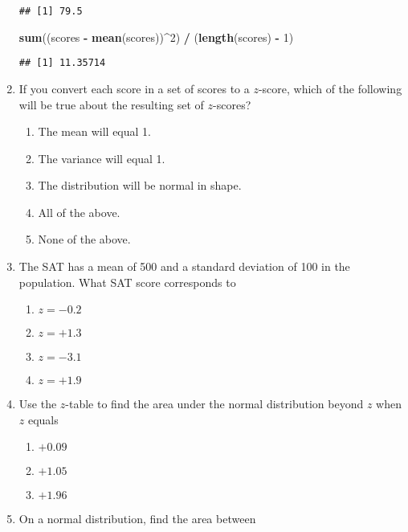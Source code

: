 \documentclass[]{article}
\newenvironment{Shaded}{\begin{snugshade}}{\end{snugshade}}
\newcommand{\KeywordTok}[1]{\textcolor[rgb]{0.13,0.29,0.53}{\textbf{#1}}}
\newcommand{\DecValTok}[1]{\textcolor[rgb]{0.00,0.00,0.81}{#1}}
\newcommand{\StringTok}[1]{\textcolor[rgb]{0.31,0.60,0.02}{#1}}
\newcommand{\OperatorTok}[1]{\textcolor[rgb]{0.81,0.36,0.00}{\textbf{#1}}}
\newcommand{\NormalTok}[1]{#1}
\providecommand{\tightlist}{%
  \setlength{\itemsep}{0pt}\setlength{\parskip}{0pt}}
\begin{document}
\begin{enumerate}
\begin{verbatim}
## [1] 79.5
\end{verbatim}

\begin{Shaded}
\begin{Highlighting}[]
\KeywordTok{sum}\NormalTok{((scores }\OperatorTok{-}\StringTok{ }\KeywordTok{mean}\NormalTok{(scores))}\OperatorTok{^}\DecValTok{2}\NormalTok{) }\OperatorTok{/}\StringTok{ }\NormalTok{(}\KeywordTok{length}\NormalTok{(scores) }\OperatorTok{-}\StringTok{ }\DecValTok{1}\NormalTok{)}
\end{Highlighting}
\end{Shaded}

\begin{verbatim}
## [1] 11.35714
\end{verbatim}
\item
  If you convert each score in a set of scores to a \(z\)-score, which
  of the following will be true about the resulting set of \(z\)-scores?

  \begin{enumerate}
  \def\labelenumii{\alph{enumii}.}
  \tightlist
  \item
    The mean will equal 1.
  \item
    The variance will equal 1.
  \item
    The distribution will be normal in shape.
  \item
    All of the above.
  \item
    None of the above.
  \end{enumerate}
\item
  The SAT has a mean of 500 and a standard deviation of 100 in the
  population. What SAT score corresponds to

  \begin{enumerate}
  \def\labelenumii{\alph{enumii}.}
  \tightlist
  \item
    \(z= -0.2\)
  \item
    \(z= +1.3\)
  \item
    \(z= -3.1\)
  \item
    \(z= +1.9\)
  \end{enumerate}
\item
  Use the \(z\)-table to find the area under the normal distribution
  beyond \(z\) when \(z\) equals

  \begin{enumerate}
  \def\labelenumii{\alph{enumii}.}
  \tightlist
  \item
    \(+0.09\)
  \item
    \(+1.05\)
  \item
    \(+1.96\)
  \end{enumerate}
\item
  On a normal distribution, find the area between


\end{enumerate}
\end{document}
